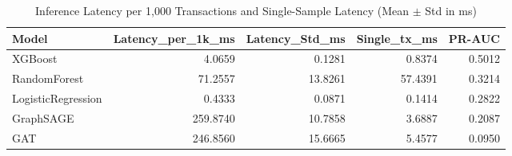 \begin{table}
\caption{Inference Latency per 1,000 Transactions and Single-Sample Latency (Mean $\pm$ Std in ms)}
\label{tab:latency_benchmark}
\begin{tabular}{lrrrr}
\toprule
Model & Latency_per_1k_ms & Latency_Std_ms & Single_tx_ms & PR-AUC \\
\midrule
XGBoost & 4.0659 & 0.1281 & 0.8374 & 0.5012 \\
RandomForest & 71.2557 & 13.8261 & 57.4391 & 0.3214 \\
LogisticRegression & 0.4333 & 0.0871 & 0.1414 & 0.2822 \\
GraphSAGE & 259.8740 & 10.7858 & 3.6887 & 0.2087 \\
GAT & 246.8560 & 15.6665 & 5.4577 & 0.0950 \\
\bottomrule
\end{tabular}
\end{table}
